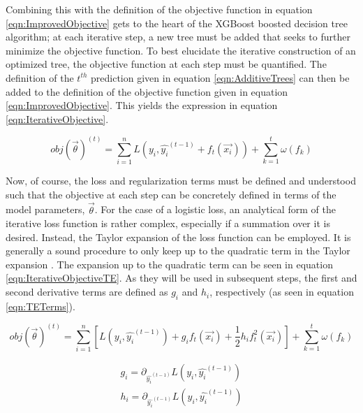 \documentclass[12pt]{ucsddissertation}
\begin{document}
Combining this with the definition of the objective function in equation \ref{eqn:ImprovedObjective} gets to the heart of the XGBoost boosted decision tree algorithm; at each iterative step, a new tree must be added that seeks to further minimize the objective function. To best elucidate the iterative construction of an optimized tree, the objective function at each step must be quantified. The definition of the $t^{th}$ prediction given in equation \ref{eqn:AdditiveTrees} can then be added to the definition of the objective function given in equation \ref{eqn:ImprovedObjective}. This yields the expression in equation \ref{eqn:IterativeObjective}.

\begin{equation}\label{eqn:IterativeObjective}
    obj(\vec{\theta})^{(t)} = \sum_{i=1}^{n} L(y_i, \hat{y_i}^{(t-1)} + f_t(\vec{x_i})) + \sum_{k= 1}^{t} \omega(f_k)
\end{equation}

Now, of course, the loss and regularization terms must be defined and understood such that the objective at each step can be concretely defined in terms of the model parameters, $\vec{\theta}$. For the case of a logistic loss, an analytical form of the iterative loss function is rather complex, especially if a summation over it is desired. Instead, the Taylor expansion of the loss function can be employed. It is generally a sound procedure to only keep up to the quadratic term in the Taylor expansion \cite{XGBoostPaper}. The expansion up to the quadratic term can be seen in equation \ref{eqn:IterativeObjectiveTE}. As they will be used in subsequent steps, the first and second derivative terms are defined as $g_i$ and $h_i$, respectively (as seen in equation \ref{eqn:TETerms}).

\begin{equation}\label{eqn:IterativeObjectiveTE}
    obj(\vec{\theta})^{(t)} = \sum_{i=1}^{n} [L(y_i, \hat{y_i}^{(t-1)}) + g_i f_t(\vec{x_i}) + \frac{1}{2} h_i f^2_t(\vec{x_i})] + \sum_{k= 1}^{t} \omega(f_k)
\end{equation}

\begin{equation}\label{eqn:TETerms}
    \begin{split}
        g_i = \partial_{\hat{y_i}^{(t-1)}} L(y_i, \hat{y_i}^{(t-1)})\\
        h_i = \partial_{\hat{y_i}^{(t-1)}} L(y_i, \hat{y_i}^{(t-1)})
    \end{split}
\end{equation}
\end{document}
